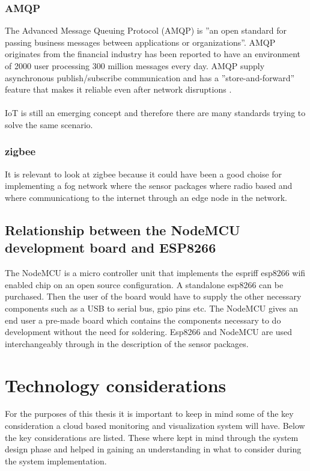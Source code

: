 \documentclass[]{uiophd}
\begin{document}
\subsection{AMQP}
The Advanced Message Queuing Protocol (AMQP) is ''an open standard for passing business messages between applications or organizations''\cite{amqp}. AMQP originates from the financial industry has been reported to have an environment of 2000 user processing 300 million messages every day. AMQP supply asynchronous publish/subscribe communication and has a ''store-and-forward'' feature that makes it reliable even after network disruptions \cite{karagiannis2015survey}. 
\\\\
IoT is still an emerging concept and therefore there are many standards trying to solve the same scenario.

\subsection{zigbee}
It is relevant to look at zigbee because it could have been a good choise for implementing a fog network where the sensor packages where radio based and where communicationg to the internet through an edge node in the network.

\section{Relationship between the NodeMCU development board and ESP8266}
The NodeMCU is a micro controller unit that implements the espriff esp8266 wifi enabled chip on an open source configuration. A standalone esp8266 can be purchased. Then the user of the board would have to supply the other necessary components such as a USB to serial bus, gpio pins etc. The NodeMCU gives an end user a pre-made board which contains the components necessary to do development without the need for soldering. Esp8266 and NodeMCU are used interchangeably through in the description of the sensor packages.

\chapter{Technology considerations}


For the purposes of this thesis it is important to keep in mind some of the key consideration a cloud based monitoring and visualization system will have. Below the key considerations are listed. These where kept in mind through the system design phase and helped in gaining an understanding in what to consider during the system implementation.
\end{document}
